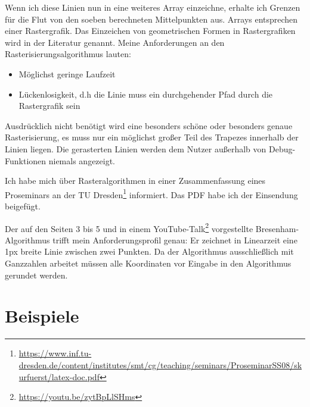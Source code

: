 	Wenn ich diese Linien nun in eine weiteres Array einzeichne, erhalte ich Grenzen für die Flut von den soeben berechneten Mittelpunkten aus. Arrays entsprechen einer Rastergrafik. Das Einzeichen von geometrischen Formen in Rastergrafiken wird in der Literatur  genannt. Meine Anforderungen an den Rasterisierungsalgorithmus lauten:
	\begin{itemize}
		\item Möglichst geringe Laufzeit
		\item Lückenlosigkeit, d.h die Linie muss ein durchgehender Pfad durch die Rastergrafik sein
	\end{itemize}
	Ausdrücklich nicht benötigt wird eine besonders schöne oder besonders genaue Rasterisierung, es muss nur ein möglichst großer Teil des Trapezes innerhalb der Linien liegen. Die gerasterten Linien werden dem Nutzer außerhalb von Debug-Funktionen niemals angezeigt.

	Ich habe mich über Rasteralgorithmen in einer Zusammenfassung eines Proseminars an der TU Dresden\footnote{\url{https://www.inf.tu-dresden.de/content/institutes/smt/cg/teaching/seminars/ProseminarSS08/skurfuerst/latex-doc.pdf}} informiert. Das PDF habe ich der Einsendung beigefügt.
	
	Der auf den Seiten 3 bis 5 und in einem YouTube-Talk\footnote{\url{https://youtu.be/zytBpLlSHms}} vorgestellte Bresenham-Algorithmus trifft mein Anforderungsprofil genau: Er zeichnet in Linearzeit eine 1px breite Linie zwischen zwei Punkten. Da der Algorithmus ausschließlich mit Ganzzahlen arbeitet müssen alle Koordinaten vor Eingabe in den Algorithmus gerundet werden.
\section{Beispiele}